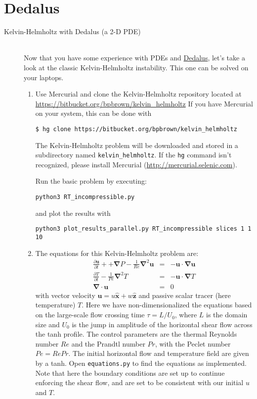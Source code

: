 \documentclass[12pt, preprint]{aastex}
\newcommand{\dedalus}{\href{http://dedalus-project.org}{Dedalus}}
\renewcommand{\vec}{\boldsymbol}
\newcommand{\del}{\vec{\nabla}}
\begin{document}
\section*{Dedalus}
\begin{description}
     \item[Kelvin-Helmholtz with Dedalus (a 2-D PDE)]~\\ 
    Now that you have some experience with PDEs and \dedalus, let's
    take a look at the classic Kelvin-Helmholtz instability.  This one
    can be solved on your laptops.
    \begin{enumerate}
      \item Use Mercurial and clone the Kelvin-Helmholtz repository located at
       \url{https://bitbucket.org/bpbrown/kelvin_helmholtz}
       If you have Mercurial on your system, this can be done with
{\footnotesize
\begin{verbatim}
$ hg clone https://bitbucket.org/bpbrown/kelvin_helmholtz
\end{verbatim}
}
       The Kelvin-Helmholtz problem will be downloaded and
       stored in a subdirectory named \verb+kelvin_helmholtz+.
       If the \verb+hg+ command isn't recognized, please install Mercurial (\url{http://mercurial.selenic.com}).
       
       Run the basic problem by executing:
\small{
\begin{verbatim}
python3 RT_incompressible.py
\end{verbatim}
}
and plot the results with
\small{
\begin{verbatim}
python3 plot_results_parallel.py RT_incompressible slices 1 1 10
\end{verbatim}
}

       \item The equations for this Kelvin-Helmholtz problem are:
         \begin{eqnarray}
           \frac{\partial \vec{u}}{\partial t} +
             +\del P - \frac{1}{Re}\del^2 \vec{u} &=& -\vec{u}\cdot\del\vec{u}
           \\
           \frac{\partial T}{\partial t} - \frac{1}{Pe}\del^2 T&=&
           -\vec{u}\cdot\del T \\
           \vec{\del}\cdot\vec{u} &=& 0 
         \end{eqnarray}
         with vector velocity $\vec{u} = u\vec{\hat{x}} + w
         \vec{\hat{z}}$ and passive scalar tracer (here temperature)
         $T$.  Here we have non-dimensionalized the equations based on
         the large-scale flow crossing time $\tau = L/U_0$, where $L$
         is the domain size and $U_0$ is the jump in amplitude of the
         horizontal shear flow across the tanh profile.
         The control
         parameters are the thermal Reynolds number $Re$ and the
         Prandtl number $Pr$, with the Peclet number $Pe=Re Pr$.  
         The initial horizontal flow and temperature field are given by a tanh.
         Open \verb+equations.py+ to find the equations
         as implemented. Note that here the boundary conditions are
         set up to continue enforcing the shear flow, and are set to
         be consistent with our initial $u$ and $T$.


\end{enumerate}
\end{description}
\end{document}
